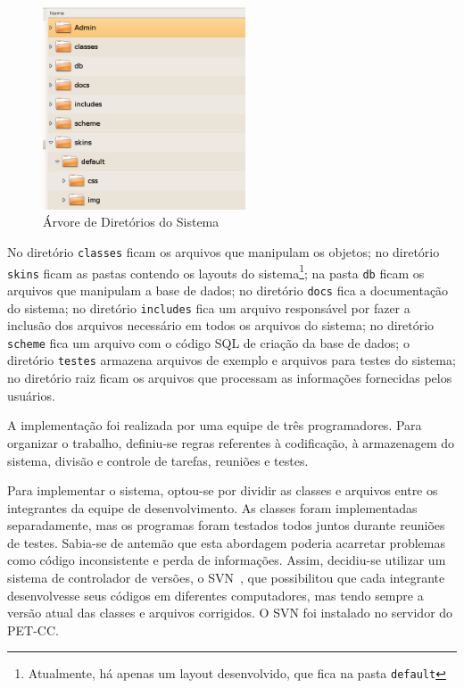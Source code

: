 \documentclass[12pt]{article}
\begin{document}
\begin{figure}[ht]
\centering
\includegraphics [width = 6cm, height = 6cm]
{img/arvoreDir.png}
\caption{\'{A}rvore de Diret\'{o}rios do Sistema}
\label{f:arvore-dir}
\end{figure}

No diret\'{o}rio \texttt{classes} ficam os arquivos que manipulam os objetos; no diret\'{o}rio \texttt{skins} ficam as pastas contendo os layouts do sistema\footnote{Atualmente, h\'{a} apenas um layout desenvolvido, que fica na pasta \texttt{default}}; na pasta \texttt{db} ficam os arquivos que manipulam a base de dados; no diret\'{o}rio \texttt{docs} fica a documenta\c{c}\~{a}o do sistema; no diret\'{o}rio \texttt{includes} fica um arquivo respons\'{a}vel por fazer a inclus\~{a}o dos arquivos necess\'{a}rio em todos os arquivos do sistema; no diret\'{o}rio \texttt{scheme} fica um arquivo com o c\'{o}digo SQL de cria\c{c}\~{a}o da base de dados; o diret\'{o}rio \texttt{testes} armazena arquivos de exemplo e arquivos para testes do sistema; no diret\'{o}rio raiz ficam os arquivos que processam as informa\c{c}\~{o}es fornecidas pelos usu\'{a}rios.

A implementa\c{c}\~{a}o foi realizada por uma equipe de tr\^{e}s programadores. Para organizar o trabalho, definiu-se regras referentes \`{a} codifica\c{c}\~{a}o, \`{a} armazenagem do sistema, divis\~{a}o e controle de tarefas, reuni\~{o}es e testes.

Para implementar o sistema, optou-se por dividir as classes e arquivos entre os integrantes da equipe de desenvolvimento. As classes foram implementadas separadamente, mas os programas foram testados todos juntos durante reuni\~{o}es de testes. Sabia-se de antem\~{a}o que esta abordagem poderia acarretar problemas como c\'{o}digo inconsistente e perda de informa\c{c}\~{o}es. Assim, decidiu-se utilizar um sistema de controlador de vers\~{o}es, o SVN~\cite{svn}, que possibilitou que cada integrante desenvolvesse seus c\'{o}digos em diferentes computadores, mas tendo sempre a vers\~{a}o atual das classes e arquivos corrigidos. O SVN foi instalado no servidor do PET-CC.
\end{document}
